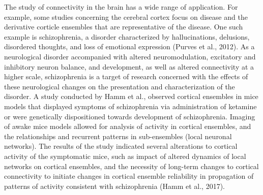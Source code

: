 \documentclass[11pt]{article}
\begin{document}
The study of connectivity in the brain has a wide range of application. For example, some studies concerning the cerebral cortex focus on disease and the derivative corticle ensembles that are representative of the disease. One such example is schizophrenia, a disorder characterized by hallucinations, delusions, disordered thoughts, and loss of emotional expression (Purves et al., 2012). As a neurological disorder accompanied with altered neuromodulation, excitatory and inhibitory neuron balance, and development, as well as altered connectivity at a higher scale, schizophrenia is a target of research concerned with the effects of these neurological changes on the presentation and characterization of the disorder. A study conducted by Hamm et al., observed cortical ensembles in mice models that displayed symptoms of schizophrenia via administration of ketamine or were genetically dispositioned towards development of schizophrenia. Imaging of awake mice models allowed for analysis of activity in cortical ensembles, and the relationships and recurrent patterns in sub-ensembles (local neuronal networks). The results of the study indicated several alterations to cortical activity of the symptomatic mice, such as impact of altered dynamics of local networks on cortical ensembles, and the necessity of long-term changes to cortical connectivity to initiate changes in cortical ensemble reliability in propagation of patterns of activity consistent with schizophrenia (Hamm et al., 2017).\par
\end{document}
